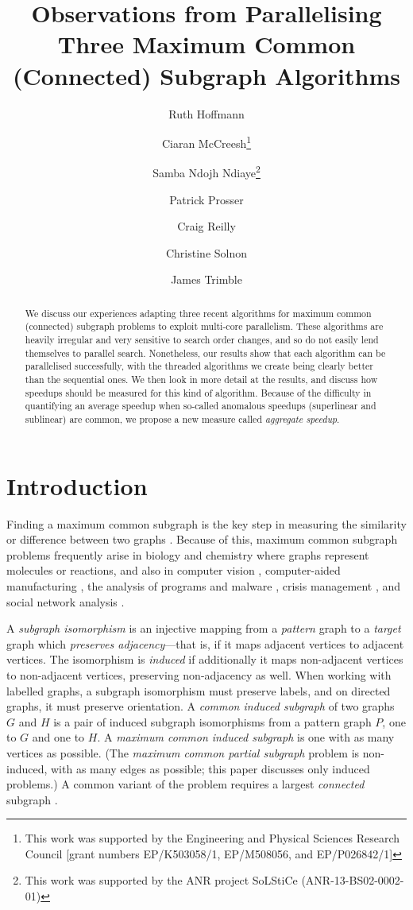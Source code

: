 \documentclass{llncs}
\title{Observations from Parallelising Three Maximum Common (Connected) Subgraph Algorithms}
\author{
    Ruth Hoffmann\inst{1}
    \and Ciaran McCreesh\thanks{This work was supported by the Engineering and Physical Sciences
        Research Council [grant numbers EP/K503058/1, EP/M508056, and EP/P026842/1]}\inst{2}
    \and Samba Ndojh Ndiaye\thanks{This work
    was supported by the ANR project SoLStiCe (ANR-13-BS02-0002-01)}\inst{3}
    \and Patrick Prosser\samethanks[1]\inst{2}
    \and Craig Reilly\samethanks[1]\inst{2}
    \and Christine Solnon\samethanks[2]\inst{4}
    \and James Trimble\samethanks[1]\inst{2}}
\institute{
    University of St Andrews, St Andrews, United Kingdom \and
    University of Glasgow, Glasgow, Scotland \and
    Universit\'e Lyon 1, LIRIS, UMR5205, F-69621, France
    \and INSA-Lyon, LIRIS, UMR5205, F-69621, France}
\begin{document}
\maketitle

\begin{abstract}
    We discuss our experiences adapting three recent algorithms for maximum common (connected)
    subgraph problems to exploit multi-core parallelism. These algorithms are heavily irregular and
    very sensitive to search order changes, and so do not easily lend themselves to parallel search.
    Nonetheless, our results show that each algorithm can be parallelised successfully, with the
    threaded algorithms we create being clearly better than the sequential ones. We then look in
    more detail at the results, and discuss how speedups should be measured for this kind of algorithm.
    Because of the difficulty in quantifying an average speedup when so-called anomalous
    speedups (superlinear and sublinear) are common, we propose a new measure called \emph{aggregate
    speedup}.
\end{abstract}

\section{Introduction}

Finding a maximum common subgraph is the key step in measuring the similarity or difference between
two graphs \cite{DBLP:journals/prl/Bunke97,DBLP:journals/prl/FernandezV01,o:Kriege15}.  Because of
this, maximum common subgraph problems frequently arise in biology and chemistry
\cite{DBLP:journals/jcamd/RaymondW02a,o:EhrlichR11,DBLP:journals/dam/GayFMSS14} where graphs
represent molecules or reactions, and also in computer vision
\cite{DBLP:journals/jair/CookH94,DBLP:conf/gbrpr/CombierDS13}, computer-aided manufacturing
\cite{o:LuoWSN17}, the analysis of programs and malware
\cite{DBLP:conf/icics/GaoRS08,DBLP:journals/compsec/ParkRS13}, crisis management
\cite{o:DelavalladeFLL16}, and social network analysis \cite{DBLP:journals/tkde/FangYZZ15}.

A \emph{subgraph isomorphism} is an injective mapping from a \emph{pattern} graph to a \emph{target}
graph which \emph{preserves adjacency}---that is, if it maps adjacent vertices to adjacent vertices.
The isomorphism is \emph{induced} if additionally it maps non-adjacent vertices to non-adjacent
vertices, preserving non-adjacency as well. When working with labelled graphs, a subgraph
isomorphism must preserve labels, and on directed graphs, it must preserve orientation. A
\emph{common induced subgraph} of two graphs $G$ and $H$ is a pair of induced subgraph isomorphisms
from a pattern graph $P$, one to $G$ and one to $H$. A \emph{maximum common induced subgraph} is one
with as many vertices as possible. (The \emph{maximum common partial subgraph} problem is
non-induced, with as many edges as possible; this paper discusses only induced problems.) A common
variant of the problem requires a largest \emph{connected} subgraph
\cite{DBLP:journals/jcamd/RaymondW02a,DBLP:conf/mco/VismaraV08,o:EhrlichR11,o:LuoWSN17}.
\end{document}
